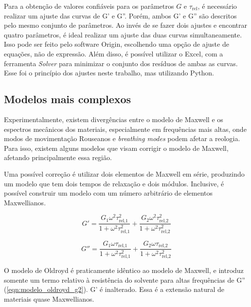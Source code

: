 			Para a obtenção de valores confiáveis para os parâmetros \(G\) e \(\tau_{\mathrm{rel}}\), é necessário realizar um ajuste das curvas de G' e G''. Porém, ambos G' e G'' são descritos pelo mesmo conjunto de parâmetros. Ao invés de se fazer dois ajustes e encontrar quatro parâmetros, é ideal realizar um ajuste das duas curvas simultaneamente. Isso pode ser feito pelo software Origin\textregistered, escolhendo uma opção de ajuste de equações, não de expressão. Além disso, é possível utilizar o Excel, com a ferramenta \emph{Solver} para minimizar o conjunto dos resíduos de ambas as curvas. Esse foi o princípio dos ajustes neste trabalho, mas utilizando Python.
			
			\subsection{Modelos mais complexos}
			\label{sec:modelos_complexos_reologia}
			Experimentalmente, existem divergências entre o modelo de Maxwell e os espectros mecânicos dos materiais, especialmente em frequências mais altas, onde modos de movimentação Rouseanos e \emph{breathing modes} podem afetar a reologia.\cite{Berret1993a} Para isso, existem alguns modelos que visam corrigir o modelo de Maxwell, afetando principalmente essa região.\cite{Garcia2018}
			
			Uma possível correção é utilizar dois elementos de Maxwell em série, produzindo um modelo que tem dois tempos de relaxação e dois módulos.\cite{Helgeson2010d} Inclusive, é possível construir um modelo com um número arbitrário de elementos Maxwellianos.\cite{Lyklema_rheology} 
			
			\begin{equation}
				G' = \dfrac{ G_1 \omega^2 \tau_{\textrm{rel,1}}^2   }{  1 + \omega^2 \tau_{\textrm{rel,1}}^2      } + \dfrac{ G_2 \omega^2 \tau_{\textrm{rel,2}}^2   }{  1 + \omega^2 \tau_{\textrm{rel,2}}^2      }
			\label{eqn:modelo_doismodos_g1}
			\end{equation}
		
			\begin{equation}
				G'' = \dfrac{  G_1 \omega  \tau_{\textrm{rel,1}}        }{ 1 + \omega^2 \tau_{\textrm{rel,1}}^2 } + \dfrac{  G_2 \omega  \tau_{\textrm{rel,2}}        }{ 1 + \omega^2 \tau_{\textrm{rel,2}}^2 }
			\label{eqn:modelo_doismodos_g2}
			\end{equation}

			O modelo de Oldroyd é praticamente idêntico ao modelo de Maxwell, e introduz somente um termo relativo à resistência do solvente para altas frequências de G'' (\autoref{eqn:modelo_oldroyd_g2}). G' é inalterado.\cite{Rehage1991, CalabreseTese} Essa é a extensão natural de materiais quase Maxwellianos.\cite{Giant_Micelles}
			
